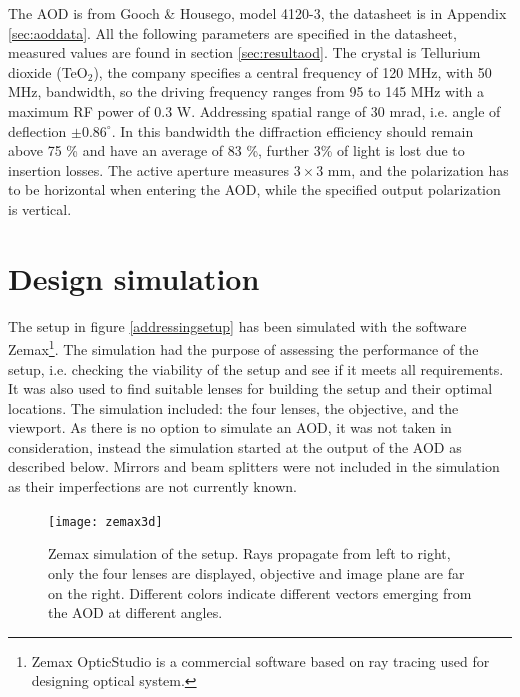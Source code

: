 The AOD is from Gooch \& Housego, model 4120-3, the datasheet is in Appendix \ref{sec:aoddata}. All the following parameters are specified in the datasheet, measured values are found in section \ref{sec:resultaod}. The crystal is Tellurium dioxide (TeO$_2$), the company specifies a central frequency of 120 MHz, with 50 MHz, bandwidth, so the driving frequency ranges from 95 to 145 MHz with a maximum RF power of 0.3 W. Addressing spatial range of 30 mrad, i.e. angle of deflection $\pm 0.86^{\circ}$. In this bandwidth the diffraction efficiency should remain above 75 \% and have an average of 83 \%, further 3\% of light is lost due to insertion losses. The active aperture measures $3\times 3$ mm, and the polarization has to be horizontal when entering the AOD, while the specified output polarization is vertical.

\section{Design simulation}
The setup in figure \ref{addressingsetup} has been simulated with the software Zemax\footnote{Zemax OpticStudio is a commercial software based on ray tracing used for designing optical system.}. The simulation had the purpose of assessing the performance of the setup, i.e. checking the viability of the setup and see if it meets all requirements. It was also used to find suitable lenses for building the setup and their optimal locations. The simulation included: the four lenses, the objective, and the viewport. As there is no option to simulate an AOD, it was not taken in consideration, instead the simulation started at the output of the AOD as described below. Mirrors and beam splitters were not included in the simulation as their imperfections are not currently known.
\begin{figure}[H]
\centering
\texttt{[image: zemax3d]}
\caption{Zemax simulation of the setup. Rays propagate from left to right, only the four lenses are displayed, objective and image plane are far on the right. Different colors indicate different vectors emerging from the AOD at different angles.}
\label{zemaxview}
\end{figure}
